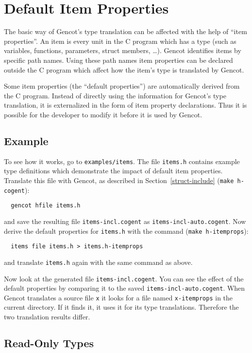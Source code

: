 \documentclass[a4paper]{report}
\newcommand{\code}[1]{\textnormal{\texttt{#1}}}
\begin{document}
\section{Default Item Properties}
\label{types-dfltprops}

The basic way of Gencot's type translation can be affected with the help of ``item properties''. An item is 
every unit in the C program which has a type (such as variables, functions, parameters, struct members, \ldots).
Gencot identifies items by specific path names. Using these path names item properties can be declared outside
the C program which affect how the item's type is translated by Gencot.

Some item properties (the ``default properties'') are automatically derived from the C program. Instead of directly
using the information for Gencot's type translation, it is externalized in the form of item property declarations. 
Thus it is possible for the developer to modify it before it is used by Gencot.

\subsection{Example}
\label{types-dfltprops-example}

To see how it works, go to \code{examples/items}. The file \code{items.h} contains example type definitions
which demonstrate the impact of default item properties. Translate this file with Gencot, as described in 
Section~\ref{struct-include} (\code{make h-cogent}): 
\begin{verbatim}
  gencot hfile items.h
\end{verbatim}
and save the resulting file \code{items-incl.cogent} as \code{items-incl-auto.cogent}. Now derive the default 
properties for \code{items.h} with the command (\code{make h-itemprops}):
\begin{verbatim}
  items file items.h > items.h-itemprops
\end{verbatim}
and translate \code{items.h} again with the same command as above. 

Now look at the generated file \code{items-incl.cogent}. You can see the effect of the default properties by 
comparing it to the saved \code{items-incl-auto.cogent}. When Gencot translates a source file \code{x} it looks
for a file named \code{x-itemprops} in the current directory. If it finds it, it uses it for its type translations.
Therefore the two translation results differ.

\subsection{Read-Only Types}
\label{types-dfltprops-readonly}
\end{document}

